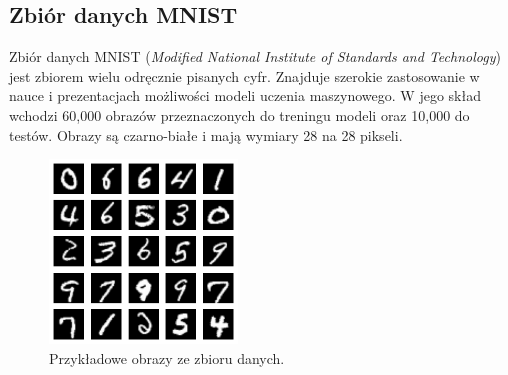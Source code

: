 \documentclass[a4paper,12pt]{book} %
\begin{document}
\subsection{Zbiór danych MNIST}
Zbiór danych MNIST (\textit{Modified National Institute of Standards and Technology}) jest zbiorem wielu odręcznie pisanych cyfr.\cite{mnist} Znajduje szerokie zastosowanie w nauce i prezentacjach możliwości modeli uczenia maszynowego. W jego skład wchodzi 60,000 obrazów przeznaczonych do treningu modeli oraz 10,000 do testów. Obrazy są czarno-białe i mają wymiary 28 na 28 pikseli.
\begin{figure}[h]
	\centering\includegraphics[width=5cm]{pictures/mnist.png}
	\caption{Przykładowe obrazy ze zbioru danych.}
\end{figure}
\newpage
\end{document}

